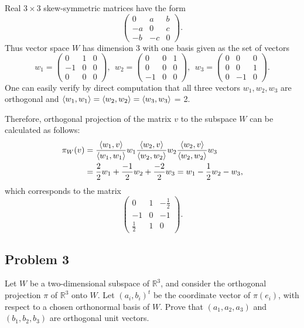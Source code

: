 \documentclass{article}
\theoremstyle{definition}
\newcommand{\R}{\mathbb{R}}
\DeclarePairedDelimiter\bilform{\langle}{\rangle}
\begin{document}
Real $3 \times 3$ skew-symmetric matrices have the form
\[ 
    \begin{pmatrix}
        0 & a & b \\
        -a & 0 & c \\
        -b & -c & 0
    \end{pmatrix}.
\]
Thus vector space $W$ has dimension $3$ with one basis given as the set of vectors
\[
    w_1 = \begin{pmatrix}
        0 & 1 & 0 \\
        -1 & 0 & 0 \\
        0 & 0 & 0
    \end{pmatrix},
    \>\>
    w_2 = \begin{pmatrix}
        0 & 0 & 1 \\
        0 & 0 & 0 \\
        -1 & 0 & 0
    \end{pmatrix},
    \>\>
    w_3 = \begin{pmatrix}
        0 & 0 & 0 \\
        0 & 0 & 1 \\
        0 & -1 & 0
    \end{pmatrix}.
\]
One can easily verify by direct computation that all three vectors $w_1, w_2, w_3$ are orthogonal and
$\bilform{w_1,w_1} = \bilform{w_2,w_2} = \bilform{w_3,w_3}$ = 2.

Therefore, orthogonal projection of the matrix $v$ to the subspace $W$ can be calculated as follows:
\begin{align*}
    \pi_W(v) 
    & = \frac{\bilform{w_1, v}}{\bilform{w_1, w_1}} w_1
    \frac{\bilform{w_2, v}}{\bilform{w_2, w_2}} w_2
    \frac{\bilform{w_2, v}}{\bilform{w_2, w_2}} w_3 \\
    & = \frac{2}{2} w_1 + \frac{-1}{2} w_2 + \frac{-2}{2} w_3
    = w_1 - \frac{1}{2} w_2 - w_3,
\end{align*}
which corresponds to the matrix
\[
    \begin{pmatrix}
        0 & 1 & -\frac{1}{2} \\
        -1 & 0 & -1 \\
        \frac{1}{2} & 1 & 0
    \end{pmatrix}.
\]

\subsection*{Problem 3}

\begin{tcolorbox}
Let $W$ be a two-dimensional subspace of $\R^3$, and consider the orthogonal projection $\pi$ of $\R^3$ onto $W$.
Let $(a_i, b_i)^t$ be the coordinate vector of $\pi(e_i)$, with respect to a chosen orthonormal basis of $W$.
Prove that $(a_1, a_2, a_3)$ and $(b_1, b_2, b_3)$ are orthogonal unit vectors.
\end{tcolorbox}
\end{document}
